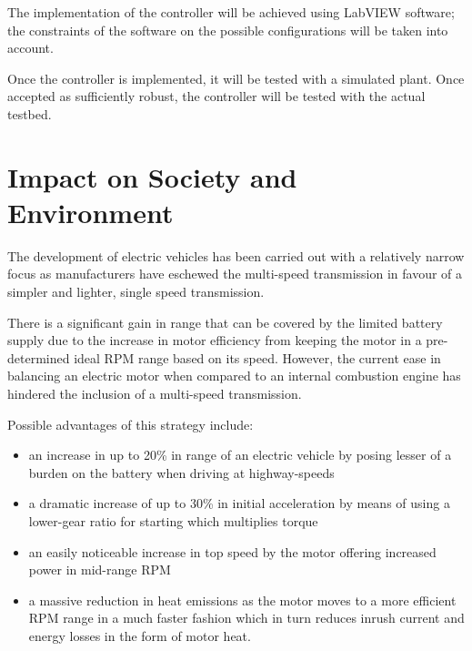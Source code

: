 \documentclass{article}
\begin{document}
\begin{flushleft}
The implementation of the controller will be achieved using LabVIEW software; the constraints of the software on the possible configurations will be taken into account. 
\end{flushleft}

\begin{flushleft}
Once the controller is implemented, it will be tested with a simulated plant. Once accepted as sufficiently robust, the controller will be tested with the actual testbed. 
\end{flushleft}

\section{Impact on Society and Environment}
\begin{flushleft}
The development of electric vehicles has been carried out with a relatively narrow focus as manufacturers have eschewed the multi-speed transmission in favour of a simpler and lighter, single speed transmission. 
\end{flushleft}

\begin{flushleft}
There is a significant gain in range that can be covered by the limited battery supply due to the increase in motor efficiency from keeping the motor in a pre-determined ideal RPM range based on its speed. However, the current ease in balancing an electric motor when compared to an internal combustion engine has hindered the inclusion of a multi-speed transmission.
\end{flushleft}

\begin{flushleft}
Possible advantages of this strategy include:
\end{flushleft}

\begin{itemize}
  \item an increase in up to 20\% in range of an electric vehicle by posing lesser of a burden on the battery when driving at highway-speeds
  \item a dramatic increase of up to 30\% in initial acceleration by means of using a lower-gear ratio for starting which multiplies torque
  \item an easily noticeable increase in top speed by the motor offering increased power in mid-range RPM
  \item a massive reduction in heat emissions as the motor moves to a more efficient RPM range in a much faster fashion which in turn reduces inrush current and energy losses in the form of motor heat.
\end{itemize}
\end{document}
